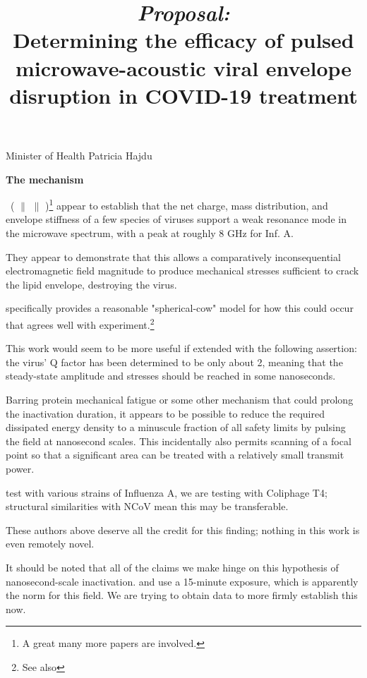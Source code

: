 \documentclass[fleqn,10pt]{paper}
\title{ {\it Proposal:}\\ Determining the efficacy of pulsed microwave-acoustic viral envelope disruption in COVID-19 treatment}
\begin{document}
\maketitle


Minister of Health
Patricia Hajdu


{\Large \textbf{The mechanism}}


\cite{Microwave2009} \textrightarrow \ (\cite{focusing2014} $\parallel$ \cite{Efficient2015} $\parallel$ \cite{Resonant2017})\footnote{A great many more papers are involved.} appear to establish that the net charge, mass distribution, and envelope stiffness of a few species of viruses support a weak resonance mode in the microwave spectrum, with a peak at roughly 8 GHz for Inf. A.

They appear to demonstrate that this allows a comparatively inconsequential electromagnetic field magnitude to produce mechanical stresses sufficient to crack the lipid envelope, destroying the virus.

\cite{Efficient2015} specifically provides a reasonable "spherical-cow" model for how this could occur that agrees well with experiment.\footnote{See also }

This work would seem to be more useful if extended with the following assertion: the virus' Q factor has been determined to be only about 2, meaning that the steady-state amplitude and stresses should be reached in some nanoseconds.

Barring protein mechanical fatigue\cite{Mechanical2013} or some other mechanism that could prolong the inactivation duration, it appears to be possible to reduce the required dissipated energy density to a minuscule fraction of all safety limits by pulsing the field at nanosecond scales. This incidentally also permits scanning of a focal point so that a significant area can be treated with a relatively small transmit power.

\cite{Efficient2015} test with various strains of Influenza A, we are testing with Coliphage T4; structural similarities with NCoV mean this may be transferable. 

These authors above deserve all the credit for this finding; nothing in this work is even remotely novel.

\begin{autem}
	It should be noted that all of the claims we make hinge on this hypothesis of nanosecond-scale inactivation. \cite{Efficient2015} and \cite{focusing2014} use a 15-minute exposure, which is apparently the norm for this field. We are trying to obtain data to more firmly establish this now.
\end{autem}
\end{document}
